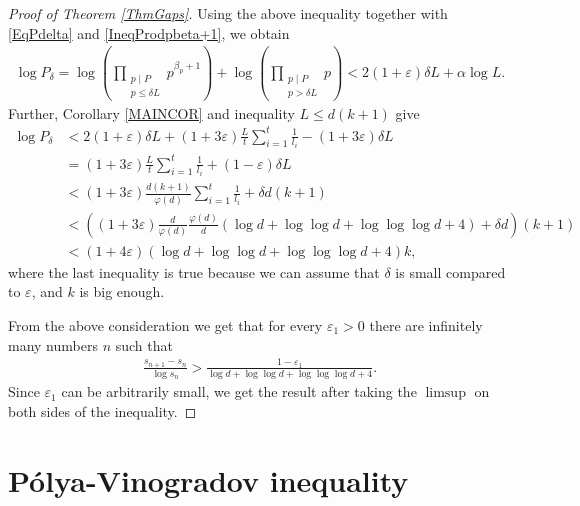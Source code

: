\documentclass[a4paper]{amsart}
\newcommand{\1}{\mathbbm{1}}
\begin{document}
\begin{proof}[Proof of Theorem \ref{ThmGaps}]
Using the above inequality together with \eqref{EqPdelta} and \eqref{IneqProdpbeta+1}, we obtain
\begin{align*}
\log P_{\delta} = \log \left(\prod_{\substack{p\mid P \\ p\leq\delta L}}p^{\beta_{p}+1}\right) + \log \left(\prod_{\substack{p\mid P \\ p>\delta L}}p \right) < 2(1+\varepsilon )\delta L + \alpha \log L.
\end{align*}
Further, Corollary \ref{MAINCOR} and inequality $L\leq d(k+1)$ give
\begin{align*}
\log P_{\delta} &< 2(1+\varepsilon )\delta L + (1+3\varepsilon )\frac{L}{t}\sum_{i=1}^{t}\frac{1}{l_{i}}-(1+3\varepsilon )\delta L \\
&= (1+3\varepsilon )\frac{L}{t}\sum_{i=1}^{t}\frac{1}{l_{i}} +(1-\varepsilon)\delta L \\
&< (1+3\varepsilon )\frac{d(k+1)}{\varphi (d)} \sum_{i=1}^{t}\frac{1}{l_{i}} + \delta d (k+1) \\
&< \left((1+3\varepsilon )\frac{d}{\varphi (d)}\frac{\varphi (d)}{d} (\log d+\log\log d+\log\log\log d+ 4) +\delta d\right)(k+1) \\
&< (1+4\varepsilon )(\log d+\log\log d+\log\log\log d+ 4)k,
\end{align*}
where the last inequality is true because we can assume that $\delta$ is small compared to $\varepsilon$, and $k$ is big enough.

From the above consideration we get that for every $\varepsilon_{1} >0$ there are infinitely many numbers $n$ such that
\begin{align*}
\frac{s_{n+1}-s_{n}}{\log s_{n}}>\frac{1-\varepsilon_{1}}{\log d + \log\log d + \log\log\log d + 4}.
\end{align*}
Since $\varepsilon_{1} $ can be arbitrarily small, we get the result after taking the $\limsup$ on both sides of the inequality.
\end{proof}



\section{Pólya-Vinogradov inequality}
\end{document}
